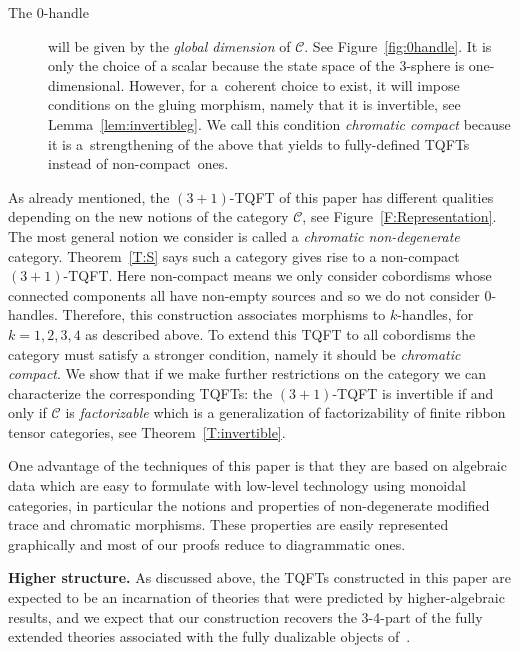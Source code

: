 \documentclass[10pt,a4paper]{amsart}
\numberwithin{equation}{section}
\numberwithin{theorem}{section}
\numberwithin{proposition}{section}
\numberwithin{definition}{section}
\numberwithin{lemma}{section}
\numberwithin{corollary}{section}
\numberwithin{remark}{section}
\numberwithin{example}{section}
\newcommand{\cat}{\mathcal{C}}
\begin{document}
\begin{description}
\item[The 0-handle] will be given by the \emph{global dimension} of $\cat$. See Figure~\ref{fig:0handle}. It is only the choice of a scalar because the state space of the 3-sphere is one-dimensional. However, for a~coherent choice to exist, it will impose conditions on the gluing morphism, namely that it is invertible, see Lemma~\ref{lem:invertibleg}. We call this condition \emph{chromatic compact} because it is a~strengthening of the above that yields to fully-defined TQFTs instead of non-compact~ones.
\end{description}

As already mentioned, the $(3+1)$-TQFT of this paper has different qualities depending on
the new notions of the category $\cat$, see Figure~\ref{F:Representation}.
The most general notion we
consider is called a \emph{chromatic non-degenerate} category.
Theorem~\ref{T:S} says such a category gives rise to a non-compact $(3+1)$-TQFT. Here non-compact means we only
consider cobordisms whose connected components all have non-empty sources and so we do not consider $0$-handles. Therefore, this construction associates morphisms to $k$-handles,
for $k=1,2,3,4$ as described above. To extend this TQFT to
all cobordisms the category must satisfy a stronger condition, namely it should be
\emph{chromatic compact}. We show that if we make further
restrictions on the category we can characterize the corresponding
TQFTs: the $(3+1)$-TQFT is invertible if and only if $\cat$ is
\emph{factorizable} which is a generalization of factorizability of
finite ribbon tensor categories, see Theorem~\ref{T:invertible}.

One advantage of the techniques of this paper is that they are based on algebraic data which are easy to formulate with low-level technology using monoidal categories, in particular the notions and properties of non-degenerate modified trace and chromatic morphisms.
These properties are easily represented graphically and most of our proofs reduce to diagrammatic ones.

\textbf{Higher structure.}
As discussed above, the TQFTs constructed in this paper are expected to be an incarnation of theories that were predicted by higher-algebraic results, and we expect that our construction recovers the 3-4-part of the fully extended theories associated with the fully dualizable objects of~\cite{BJSS}.
\end{document}
